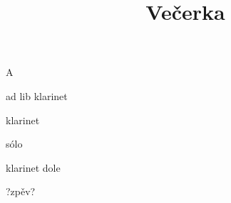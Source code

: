 \documentclass[timestamp]{jazzgrid}
\title{\textbf{Večerka}}
\begin{document}
\maketitle
\begin{musicsection}{A}
\barline
	{\barfour{}
		{}
		{}
		{}
		{}
	}
	{\barfour{}
		{}
		{}
		{}
		{}
	}
	{\barfour{}
		{}
		{}
		{}
		{}
	}
	{\barfour{}
		{}
		{}
		{}
		{}
	}
\barline
	{\barfour{}
		{}
		{}
		{}
		{}
	}
	{\barfour{}
		{}
		{}
		{}
		{}
	}
	{\barfour{}
		{}
		{}
		{}
		{}
	}
	{\barfour{}
		{}
		{}
		{}
		{}
	}
\barline
	{\barfour{}
		{}
		{}
		{}
		{}
	}
	{\barfour{}
		{}
		{}
		{}
		{}
	}
	{\barfour{}
		{}
		{}
		{}
		{}
	}
	{\barfour{}
		{}
		{}
		{}
		{}
	}
\barline
	{\barfour{}
		{}
		{}
		{}
		{}
	}
	{\barfour{}
		{}
		{}
		{}
		{}
	}
	{\barfour{}
		{}
		{}
		{}
		{}
	}
	{\barfour{}
		{}
		{}
		{}
		{}
	}
\end{musicsection}

\begin{multicols*}{2}
	\begin{description}[noitemsep,align=right,labelwidth=\widthof{\bfseries{\scriptsize AA}}]
	\scriptsize
	\item [A] ad lib klarinet
	\item [A] klarinet
	\item [AA] sólo
	\item [A] klarinet dole
	\item [A] ?zpěv?
\end{description}
\vfill\null
\columnbreak
\end{multicols*}
\end{document}
